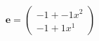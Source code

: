 \documentclass[preview]{standalone}
\begin{document}
\begin{align*}
\mathbf{e} = \begin{pmatrix}-1 + -1x^{2} \\ -1 + 1x^{1}\end{pmatrix}
\end{align*}
\end{document}
